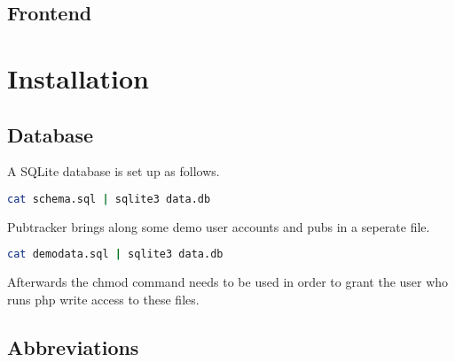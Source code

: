 \documentclass[a4paper,10pt]{scrartcl}
\begin{document}
\subsection{Frontend}

\section{Installation}
\subsection{Database}
A SQLite database is set up as follows.
\begin{lstlisting}[language=bash]
cat schema.sql | sqlite3 data.db
\end{lstlisting}
Pubtracker brings along some demo user accounts and pubs in a seperate file.
\begin{lstlisting}[language=bash]
cat demodata.sql | sqlite3 data.db
\end{lstlisting}
Afterwards the chmod command needs to be used in order to grant the user who
runs php write access to these files.

\begin{appendix}

\section{Abbreviations}
\begin{acronym}
\end{acronym}
\end{appendix}
\end{document}
